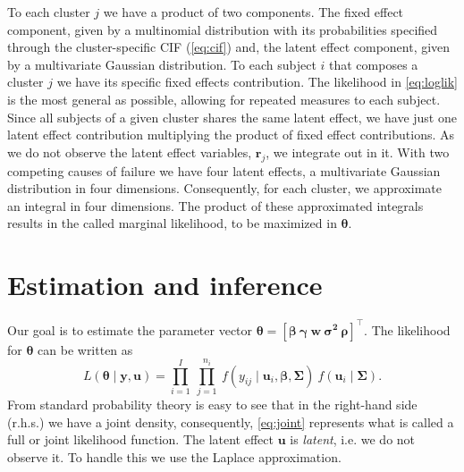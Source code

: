 \documentclass[a4paper,12pt]{article}
\begin{document}
To each cluster \(j\) we have a product of two components. The fixed
effect component, given by a multinomial distribution with its
probabilities specified through the cluster-specific CIF
(\autoref{eq:cif}) and, the latent effect component, given by a
multivariate Gaussian distribution. To each subject \(i\) that composes
a cluster \(j\) we have its specific fixed effects contribution. The
likelihood in \autoref{eq:loglik} is the most general as possible,
allowing for repeated measures to each subject. Since all subjects of a
given cluster shares the same latent effect, we have just one latent
effect contribution multiplying the product of fixed effect
contributions. As we do not observe the latent effect variables,
\(\bm{r}_{j}\), we integrate out in it. With two competing causes of
failure we have four latent effects, a multivariate Gaussian
distribution in four dimensions. Consequently, for each cluster, we
approximate an integral in four dimensions. The product of these
approximated integrals results in the called marginal likelihood, to be
maximized in \(\bm{\theta}\).

\section{Estimation and inference}
\label{inference}

Our goal is to estimate the parameter vector \(\bm{\theta} =
[\bm{\beta}~\bm{\gamma}~\bm{w}~\bm{\sigma^{2}}~ \bm{\rho}]^{\top}\). The
likelihood for \(\bm{\theta}\) can be written as
\begin{equation}
 L(\bm{\theta} \mid \bm{y,u}) =
 \prod_{i=1}^{I}~\prod_{j=1}^{n_{i}}~
 f(y_{ij} \mid \bm{u}_{i}, \bm{\beta,\Sigma})~
 f(\bm{u}_{i} \mid \bm{\Sigma}).
 \label{eq:joint}
\end{equation}
From standard probability theory is easy to see that in the right-hand
side (r.h.s.) we have a joint density, consequently, \autoref{eq:joint}
represents what is called a full or joint likelihood function. The
latent effect \(\bm{u}\) is \textit{latent}, i.e. we do not observe
it. To handle this we use the Laplace approximation.
\end{document}
